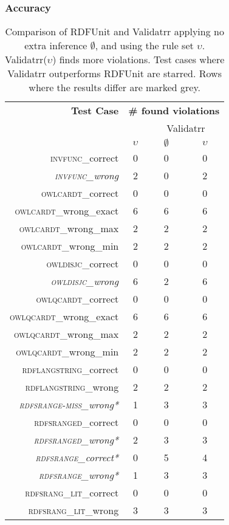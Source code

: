 \subsubsection{Accuracy}
\begin{table}
	\centering
	\caption{\small Comparison of  RDFUnit and Validatrr applying no extra inference $\emptyset$, and using the rule set $\upsilon$. %
		Validatrr($\upsilon$) finds more violations. %
		Test cases where Validatrr outperforms RDFUnit are starred. Rows where the results differ are marked grey.}
	\label{table:unit-test}
	\scriptsize
	\begin{tabular}{rccc} \toprule
		\bf Test Case & \multicolumn{3}{c}{\textbf{\# found violations}} \\
		& \makecell{RDFUnit} & \multicolumn{2}{c}{Validatrr} \\
		& $\upsilon$ & $\emptyset$ & $\upsilon$ \\
		\hline
		{{\scshape invfunc}\_correct} & 0 & 0 & 0  \\ 
		\rowcolor{lightergrey} \textit{{\scshape invfunc}\_wrong} & 2 & 0 & 2 \\ 
		{{\scshape owlcardt}\_correct} & 0 & 0 & 0  \\ 
		{{\scshape owlcardt}\_wrong\_exact} & 6 & 6 & 6 \\ 
		{{\scshape owlcardt}\_wrong\_max} & 2 & 2 & 2  \\ 
		{{\scshape owlcardt}\_wrong\_min} & 2 & 2 & 2  \\ 
		{{\scshape owldisjc}\_correct} & 0 & 0 & 0  \\ 
		\rowcolor{lightergrey} \textit{{\scshape owldisjc}\_wrong} & 6 & 2 & 6  \\ 
		{{\scshape owlqcardt}\_correct} & 0 & 0 & 0  \\ 
		{{\scshape owlqcardt}\_wrong\_exact} & 6 & 6 & 6 \\ 
		{{\scshape owlqcardt}\_wrong\_max} & 2 & 2 & 2  \\ 
		{{\scshape owlqcardt}\_wrong\_min} & 2 & 2 & 2  \\ 
		{{\scshape rdflangstring}\_correct} & 0 & 0 & 0  \\ 
		{\scshape rdflangstring}\_wrong & 2 & 2 & 2 \\ 
		\rowcolor{lightergrey} \textit{{\scshape rdfsrange-miss}\_wrong*} & 1 & 3 & 3  \\ 
		{{\scshape rdfsranged}\_correct} & 0 & 0 & 0  \\ 
		\rowcolor{lightergrey} \textit{{\scshape rdfsranged}\_wrong*} & 2 & 3 & 3  \\ 
		\rowcolor{lightergrey} \textit{{\scshape rdfsrange}\_correct*} & 0 & 5 & 4  \\ 
		\rowcolor{lightergrey} \textit{{\scshape rdfsrange}\_wrong*} & 1 & 3 & 3  \\ 
		{\scshape rdfsrang\_lit}\_correct & 0 & 0 & 0 \\ 
		{\scshape rdfsrang\_lit}\_wrong & 3 & 3 & 3  \\
		\bottomrule 
	\end{tabular} 
\end{table}
